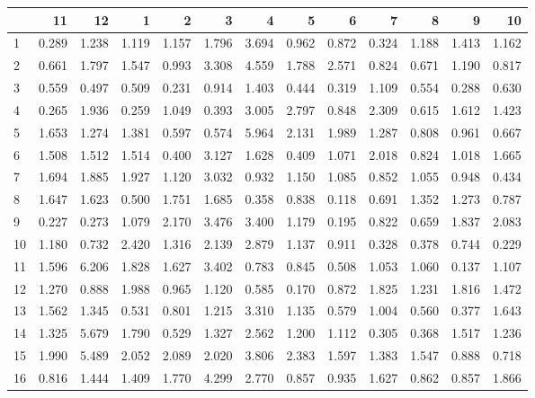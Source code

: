 \begin{tabular}{lrrrrrrrrrrrr}
\toprule
{} &     11 &     12 &     1  &     2  &     3  &     4  &     5  &     6  &     7  &     8  &     9  &     10 \\
\midrule
1   &  0.289 &  1.238 &  1.119 &  1.157 &  1.796 &  3.694 &  0.962 &  0.872 &  0.324 &  1.188 &  1.413 &  1.162 \\
2   &  0.661 &  1.797 &  1.547 &  0.993 &  3.308 &  4.559 &  1.788 &  2.571 &  0.824 &  0.671 &  1.190 &  0.817 \\
3   &  0.559 &  0.497 &  0.509 &  0.231 &  0.914 &  1.403 &  0.444 &  0.319 &  1.109 &  0.554 &  0.288 &  0.630 \\
4   &  0.265 &  1.936 &  0.259 &  1.049 &  0.393 &  3.005 &  2.797 &  0.848 &  2.309 &  0.615 &  1.612 &  1.423 \\
5   &  1.653 &  1.274 &  1.381 &  0.597 &  0.574 &  5.964 &  2.131 &  1.989 &  1.287 &  0.808 &  0.961 &  0.667 \\
6   &  1.508 &  1.512 &  1.514 &  0.400 &  3.127 &  1.628 &  0.409 &  1.071 &  2.018 &  0.824 &  1.018 &  1.665 \\
7   &  1.694 &  1.885 &  1.927 &  1.120 &  3.032 &  0.932 &  1.150 &  1.085 &  0.852 &  1.055 &  0.948 &  0.434 \\
8   &  1.647 &  1.623 &  0.500 &  1.751 &  1.685 &  0.358 &  0.838 &  0.118 &  0.691 &  1.352 &  1.273 &  0.787 \\
9   &  0.227 &  0.273 &  1.079 &  2.170 &  3.476 &  3.400 &  1.179 &  0.195 &  0.822 &  0.659 &  1.837 &  2.083 \\
10  &  1.180 &  0.732 &  2.420 &  1.316 &  2.139 &  2.879 &  1.137 &  0.911 &  0.328 &  0.378 &  0.744 &  0.229 \\
11  &  1.596 &  6.206 &  1.828 &  1.627 &  3.402 &  0.783 &  0.845 &  0.508 &  1.053 &  1.060 &  0.137 &  1.107 \\
12  &  1.270 &  0.888 &  1.988 &  0.965 &  1.120 &  0.585 &  0.170 &  0.872 &  1.825 &  1.231 &  1.816 &  1.472 \\
13  &  1.562 &  1.345 &  0.531 &  0.801 &  1.215 &  3.310 &  1.135 &  0.579 &  1.004 &  0.560 &  0.377 &  1.643 \\
14  &  1.325 &  5.679 &  1.790 &  0.529 &  1.327 &  2.562 &  1.200 &  1.112 &  0.305 &  0.368 &  1.517 &  1.236 \\
15  &  1.990 &  5.489 &  2.052 &  2.089 &  2.020 &  3.806 &  2.383 &  1.597 &  1.383 &  1.547 &  0.888 &  0.718 \\
16  &  0.816 &  1.444 &  1.409 &  1.770 &  4.299 &  2.770 &  0.857 &  0.935 &  1.627 &  0.862 &  0.857 &  1.866 \\

\end{tabular}
